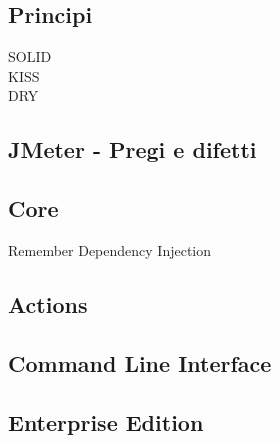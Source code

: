 \subsection{Principi}
SOLID\\
KISS\\
DRY
\subsection{JMeter - Pregi e difetti}
\subsection{Core}
Remember Dependency Injection
\subsection{Actions}
\subsection{Command Line Interface}
\subsection{Enterprise Edition}